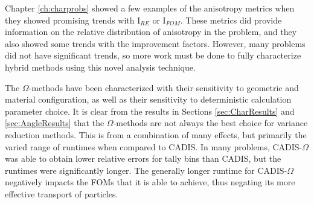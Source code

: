 Chapter \ref{ch:charprobs} showed a few examples of the anisotropy metrics when
they showed promising trends with I$_{RE}$ or I$_{FOM}$. These metrics did
provide information on the relative distribution of anisotropy in the problem,
and they also showed some trends with the improvement factors. However, many
problems did not have significant trends, so more work must be done to fully
characterize hybrid methods using this novel analysis technique.

The $\Omega$-methods have been characterized with their sensitivity to
geometric and material configuration, as well as their sensitivity to
deterministic calculation parameter choice. It is clear from the results in
Sections \ref{sec:CharResults} and \ref{sec:AngleResults} that the
$\Omega$-methods are not always the best choice for variance reduction methods.
This is from a combination of many effects, but primarily the varied range of
runtimes when compared to CADIS. In many problems, CADIS-$\Omega$ was able to
obtain lower relative errors for tally bins than CADIS, but the runtimes were
significantly longer. The generally longer runtime for CADIS-$\Omega$
negatively impacts the FOMs that it is able to achieve, thus negating its more
effective transport of particles.
